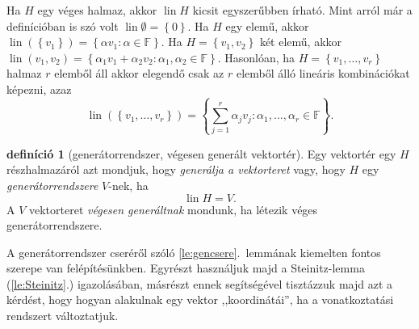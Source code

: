 \documentclass[a4paper, showtrims]{memoir}
\theoremstyle{plain}
\theoremstyle{remark}
\theoremstyle{definition}
\newtheorem{definition}[proposition]{definíció}
\DeclareMathOperator{\lin}{lin}
\begin{document}
Ha $H$ egy véges halmaz, akkor $\lin H$ kicsit egyszerűbben írható.
Mint arról már a definícióban is szó volt $\lin \emptyset=\left\{ 0 \right\}$.
Ha $H$ egy elemű, akkor $\lin (\left\{ v_1 \right\})=\left\{ \alpha v_1:\alpha\in\mathbb{F} \right\}$.
Ha $H=\left\{ v_1,v_2 \right\}$ két elemű, akkor
$\lin({v_1,v_2})=\left\{ \alpha_1v_1+\alpha_2v_2:\alpha_1,\alpha_2\in\mathbb{F} \right\}$.
Hasonlóan, ha $H=\left\{ v_1,\ldots,v_r \right\}$ halmaz $r$ elemből áll akkor elegendő csak az $r$ elemből álló lineáris kombinációkat képezni, azaz
\[
	\lin \left( \left\{ v_1,\ldots,v_r \right\} \right)
	=
	\left\{ \sum_{j=1}^r\alpha_jv_j:\alpha_1,\ldots,\alpha_r\in\mathbb{F} \right\}.
\]
\begin{definition}[generátorrendszer, végesen generált vektortér]
	Egy vektortér egy $H$ részhalmazáról azt mondjuk, hogy \emph{generálja a vektorteret}
	vagy, hogy $H$ egy \emph{generátorrendszere} $V$-nek, ha
	\[
		\lin H=V.
	\]
	A $V$ vektorteret \emph{végesen generáltnak} mondunk, ha létezik véges generátorrendszere.
\end{definition}

A generátorrendszer cseréről szóló \ref{le:gencsere}.~lemmának kiemelten fontos szerepe van felépítésünkben.
Egyrészt használjuk majd a Steinitz-lemma (\ref{le:Steinitz}.) igazolásában,
másrészt ennek segítségével tisztázzuk majd azt a kérdést,
hogy hogyan alakulnak egy vektor ,,koordinátái'', ha a vonatkoztatási rendszert változtatjuk.
\end{document}
